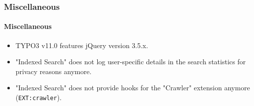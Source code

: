 %

\begin{frame}[fragile]
	\frametitle{Miscellaneous}
	\framesubtitle{Miscellaneous}

	\begin{itemize}
		\item TYPO3 v11.0 features jQuery version 3.5.x.
		\item "Indexed Search" does not log user-specific details in the search
			statistics for privacy reasons anymore.
		\item "Indexed Search" does not provide hooks for the "Crawler" extension
			anymore (\small\texttt{EXT:crawler}\normalsize).
	\end{itemize}

\end{frame}

